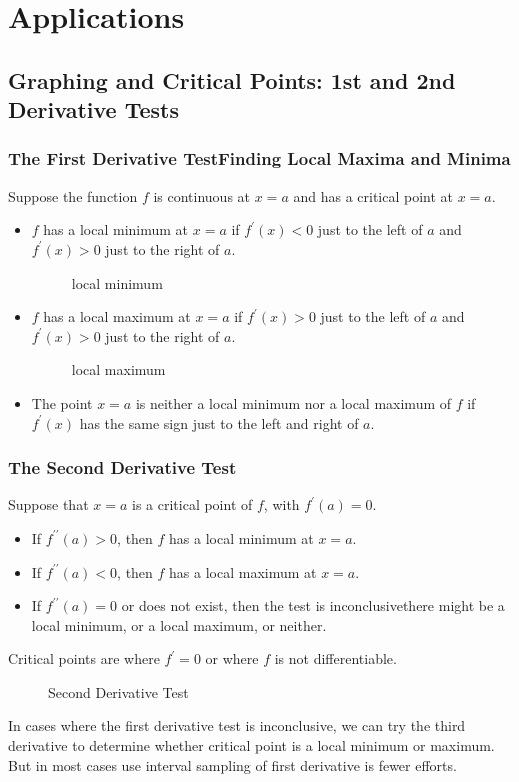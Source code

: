 \chapter{Applications}
\section{Graphing and Critical Points: 1st and 2nd Derivative Tests}
\subsection{The First Derivative Test\textemdash Finding Local Maxima and Minima}
Suppose the function $f$ is continuous at $x=a$ and has a critical point at $x=a$.
\begin{itemize}
\item $f$ has a local minimum at $x=a$ if $f^\prime(x)<0$ just to the left of $a$ and $f^\prime(x)>0$ just to the right of $a$.
  \begin{figure}[H]
    \centering
    \caption{local minimum}
  \end{figure}
\item $f$ has a local maximum at $x=a$ if $f^\prime (x)>0$ just to the left of $a$ and $f^\prime (x)>0$ just to the right of $a$.
  \begin{figure}[H]
    \centering
    \caption{local maximum}
  \end{figure}
\item The point $x=a$ is neither a local minimum nor a local maximum of $f$ if $f^\prime (x)$ has the same sign just to the left and right of $a$.
\end{itemize}

\subsection{The Second Derivative Test}
Suppose that $x=a$ is a critical point of $f$, with $f^\prime(a)=0$.
\begin{itemize}
\item If $f^{\prime\prime}(a)>0$, then $f$ has a local minimum at $x=a$.
\item If $f^{\prime\prime}(a)<0$, then $f$ has a local maximum at $x=a$.
\item If $f^{\prime\prime}(a)=0$ or does not exist, then the test is inconclusive\textemdash there might be a local minimum, or a local maximum, or neither.
\end{itemize}
\begin{definition}
Critical points are where $f^\prime=0$ or where $f$ is not differentiable.
\end{definition}
\begin{figure}[H]
  \centering
  \caption{Second Derivative Test}
\end{figure}
\begin{note}
  In cases where the first derivative test is inconclusive, we can try the third derivative to determine whether critical point is a local minimum or maximum. But in most cases use interval sampling of first derivative is fewer efforts.
\end{note}

